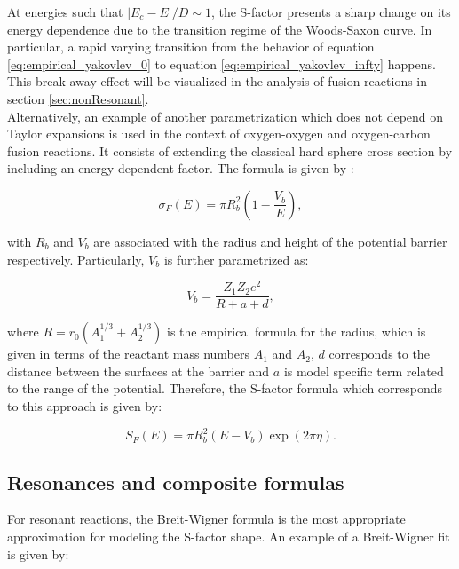 \documentclass[openany]{book}
\begin{document}
At energies such that $|E_c - E|/D \sim 1$, the S-factor presents a sharp change on its energy dependence due to the transition regime of the Woods-Saxon curve. In particular, a rapid varying transition from the behavior of equation \ref{eq:empirical_yakovlev_0} to equation  \ref{eq:empirical_yakovlev_infty} happens. This break away effect will be visualized in the analysis of fusion reactions in section \ref{sec:nonResonant}. \\

Alternatively, an example of another parametrization which does not depend on Taylor expansions is used in the context of  oxygen-oxygen and oxygen-carbon fusion reactions. It consists of extending the classical hard sphere cross section by including an energy dependent factor. The formula is given by \cite{kovar_geesaman_braid_eisen_henning_ophel_paul_rehm_sanders_sperr_et_1979}:

\begin{equation}\label{eq:middleFusion_empirical_crossSection_Parametrized}
	\sigma_F(E) = \pi R_b^2 \left(1 - \frac{V_b}{E}\right),
\end{equation}

with $R_b$ and $V_b$ are associated with the radius and height of the potential barrier respectively. Particularly, $V_b$ is further parametrized as: 

\begin{equation}\label{eq:middleFusion_empirical_barrier_Parametrized}
	V_b = \frac{Z_1Z_2e^2}{R + a + d},
\end{equation}

where $R = r_0 (A^{1/3}_1 + A^{1/3}_2)$ is the empirical formula for the radius, which is given in terms of the reactant mass numbers $A_1$ and $A_2$, $d$ corresponds to the distance between the surfaces at the barrier and $a$ is model specific term related to the range of the potential. Therefore, the S-factor formula which corresponds to this approach is given by: 

\begin{equation}\label{eq:middleFusion_empirical_sFactor}
	S_F(E) = \pi R_b^2 \left(E - V_b\right) \exp (2\pi \eta).
\end{equation}


\subsection{Resonances and composite formulas} \label{sub:empirical_resonances}


For resonant reactions, the Breit-Wigner formula is the most appropriate approximation for modeling the S-factor shape. An example of a Breit-Wigner fit is given by: 
\end{document}
